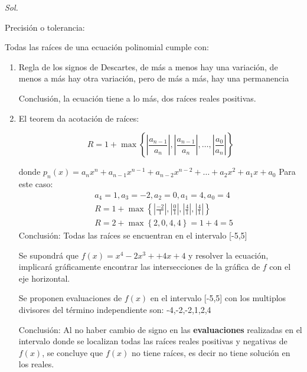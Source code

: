 \textit{ Sol. }

Precisión o tolerancia:

Todas las raíces de una ecuación polinomial cumple con:

\begin{enumerate}
	\item Regla de los signos de Descartes, de más a menos hay una variación, de menos a más hay otra variación, pero de más a más, hay una permanencia

	      Conclusión, la ecuación tiene a lo más, dos raíces reales positivas.
	\item El teorem da acotación de raíces:
	      \begin{theorem}
		      \begin{equation}
			      R=1+\max \left\{ \left\lvert \frac{a_{n-1}}{a_n} \right\rvert,\left\lvert \frac{a_{n-1}}{a_n} \right\rvert, \dots , \left\lvert \frac{a_{0}}{a_n} \right\rvert  \right\}
		      \end{equation}
	      \end{theorem}
	      donde $p_n(x)= a_{n}x^n+a_{n-1}x^{n-1}+a_{n-2}x^{n-2}+\dots+a_{2}x^2+a_{1}x+a_0$
	      Para este caso:
	      \begin{align*}
		       & a_4=1,a_3=-2,a_2=0,a_1=4,a_0=4                                                                                                                                             \\
		       & R=1+\max \left\{ \left\lvert \frac{-2}{1}\right\rvert,\left\lvert \frac{0}{1}\right\rvert,\left\lvert \frac{4}{1}\right\rvert,\left\lvert \frac{4}{1}\right\rvert \right\} \\
		       & R=2+\max \left\{2,0,4,4\right\}=1+4=5
	      \end{align*}
	      Conclusión: Todas las raíces se encuentran en el intervalo [-5,5]

	      Se supondrá que $f(x)=x^4-2x^3++4x+4$ y resolver la ecuación, implicará gráficamente
	      encontrar las intersecciones de la gráfica de $f$ con el eje horizontal.

	      Se proponen evaluaciones de $f(x)$ en el intervalo [-5,5] con los multiplos
	      divisores del término independiente son: -4,-2,-2,1,2,4

	      Conclusión: Al no haber cambio de signo en las \textbf{evaluaciones} realizadas en el intervalo donde se localizan todas las raíces reales positivas y negativas de $f(x)$, se
	      concluye que $f(x)$ no tiene raíces, es decir no tiene solución en los reales.
\end{enumerate}


